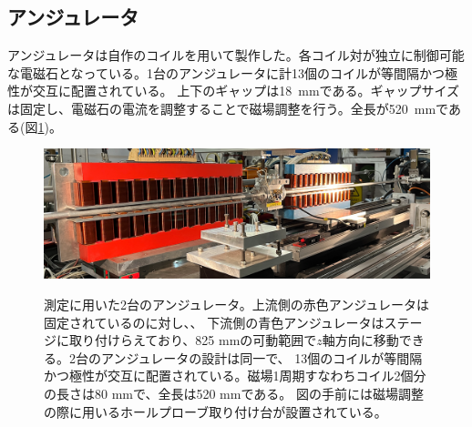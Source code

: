 \documentclass[a4paper,11pt,uplatex]{jsbook}
\begin{document}
\subsection{アンジュレータ}
アンジュレータは自作のコイルを用いて製作した。各コイル対が独立に制御可能な電磁石となっている。1台のアンジュレータに計13個のコイルが等間隔かつ極性が交互に配置されている。
上下のギャップは18~mmである。ギャップサイズは固定し、電磁石の電流を調整することで磁場調整を行う。全長が520~mmである(図\ref{undulator})。
\begin{figure}[H]
  \centering
  \includegraphics[width=\linewidth]{image/3-undulator.png}\\
  \caption[アンジュレータ]{測定に用いた2台のアンジュレータ。上流側の赤色アンジュレータは固定されているのに対し、、
  下流側の青色アンジュレータはステージに取り付けらえており、825 mmの可動範囲で$z$軸方向に移動できる。2台のアンジュレータの設計は同一で、
  13個のコイルが等間隔かつ極性が交互に配置されている。磁場1周期すなわちコイル2個分の長さは80 mmで、全長は520 mmである。
  図の手前には磁場調整の際に用いるホールプローブ取り付け台が設置されている。} 
  \label{undulator}
\end{figure}
\end{document}
